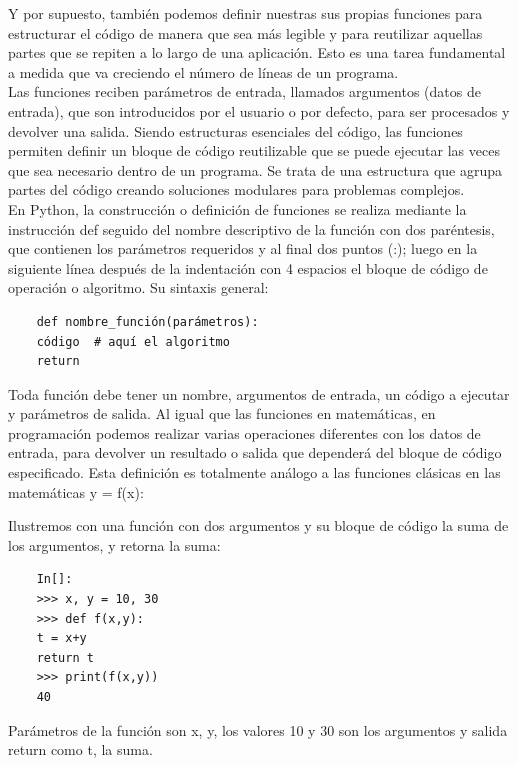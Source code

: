 Y por supuesto, también  podemos definir nuestras sus propias funciones para estructurar el código de manera que sea más legible y para reutilizar aquellas partes que se repiten a lo largo de una aplicación. Esto es una tarea fundamental a medida que va creciendo el número de líneas de un programa.\\


Las funciones reciben parámetros de entrada, llamados argumentos (datos de entrada), que son introducidos por el usuario o por defecto, para  ser procesados y devolver una salida. Siendo estructuras esenciales del código, las funciones permiten definir un bloque de código reutilizable que se puede ejecutar las veces que sea necesario dentro de un programa. Se trata de una estructura que agrupa partes del código creando soluciones modulares para problemas complejos.\\

En Python, la construcción o definición  de funciones se realiza mediante la instrucción {\ttfamily def} seguido del 
nombre descriptivo de la función con dos paréntesis, que contienen los parámetros requeridos y al final dos puntos (:);  luego en la siguiente línea después de la indentación con 4 espacios el bloque de código de operación o algoritmo. Su  sintaxis general:  

\begin{lstlisting}
	def nombre_función(parámetros):
	código  # aquí el algoritmo
	return 	
\end{lstlisting}

Toda función debe tener un nombre, argumentos de entrada, un código a ejecutar y parámetros de salida. Al igual que las funciones en matemáticas, en programación podemos realizar varias operaciones diferentes con los datos de  entrada, para devolver un resultado o salida que dependerá del bloque de código especificado. Esta definición es totalmente análogo a las  funciones clásicas en las matemáticas {\ttfamily y = f(x)}:


Ilustremos con una función con dos argumentos y su bloque de código la suma de los argumentos, y retorna la suma: 

\begin{lstlisting}
	In[]:		
	>>> x, y = 10, 30
	>>> def f(x,y):
	t = x+y
	return t
	>>> print(f(x,y))
	40
\end{lstlisting}

Parámetros de la función son { \ttfamily x, y}, { }los valores 10 y 30 son los argumentos y  salida  {\ttfamily return} como {\ttfamily t}, la suma.\\ 

